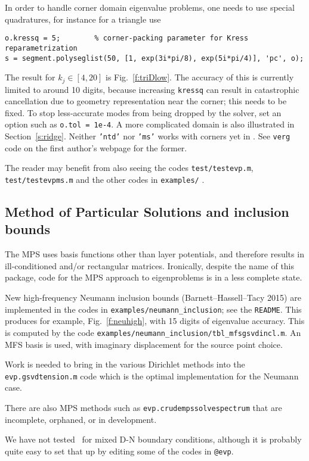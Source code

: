 In order to handle corner domain eigenvalue problems, one needs to
use special quadratures,
for instance for a triangle use
\begin{verbatim}
o.kressq = 5;        % corner-packing parameter for Kress reparametrization
s = segment.polyseglist(50, [1, exp(3i*pi/8), exp(5i*pi/4)], 'pc', o);
\end{verbatim}
The result for $k_j \in [4,20]$ is Fig.~\ref{f:triDlow}.
The accuracy of this is currently limited to around 10 digits,
because increasing {\tt kressq}
can result in catastrophic cancellation due to geometry representation
near the corner; this needs to be fixed.
To stop less-accurate modes from being dropped by the solver,
set an option such as
{\tt o.tol = 1e-4}.
A more complicated domain is also illustrated in Section~\ref{s:ridge}.
Neither {\tt 'ntd'} nor {\tt 'ms'} works with corners yet in \mpspack.
See {\tt verg} code on the first author's webpage for the former.

The reader may benefit from also seeing the
codes {\tt test/testevp.m}, {\tt test/testevpms.m}
and the other codes in {\tt examples/} .





\bfi %
\efi

\subsection{Method of Particular Solutions and inclusion bounds}

The MPS \cite{mps}
uses basis functions other than layer potentials, and therefore
results in ill-conditioned and/or rectangular matrices.
Ironically, despite the name of this package,
code for the MPS approach to eigenproblems is in a less complete state.

New high-frequency Neumann inclusion bounds (Barnett--Hassell--Tacy 2015)
are implemented in the codes in \verb+examples/neumann_inclusion+;
see the {\tt README}. This produces for example, Fig.~\ref{f:neuhigh},
with 15 digits of eigenvalue accuracy.
This is computed by the code \verb+examples/neumann_inclusion/tbl_mfsgsvdincl.m+.
An MFS basis is used, with imaginary displacement for the source point choice.

Work is needed to bring in the various Dirichlet methods into the
{\tt evp.gsvdtension.m} code which is the optimal implementation for
the Neumann case.

There are also MPS methods such as {\tt evp.crudempssolvespectrum}
that are incomplete, orphaned, or in development.

We have not tested \mpspack\ for mixed D-N boundary conditions, although
it is probably quite easy to set that up by editing some of the
codes in {\tt @evp}.


